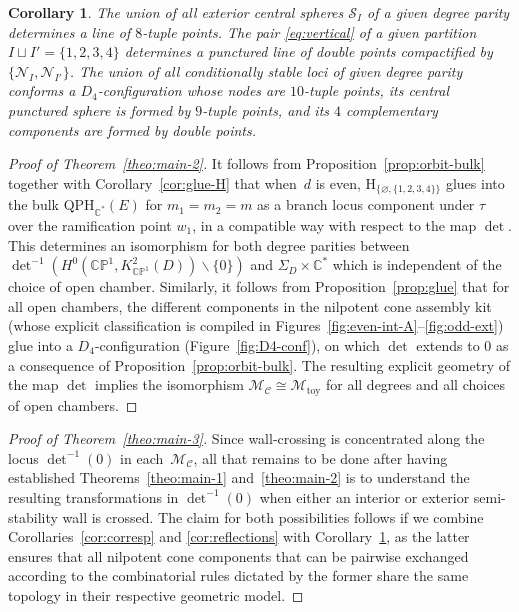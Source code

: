 \documentclass[10pt,a4paper]{amsart}
\newcommand{\field}[1]{\ensuremath{\mathbb{#1}}}
\newcommand{\CC}{\field{C}}
\newcommand{\PP}{\field{P}}
\newcommand{\curly}[1]{\mathscr{#1}}
\newcommand{\cM}{\curly{M}}
\newcommand{\cN}{\curly{N}}
\newcommand{\cS}{\curly{S}}
\newcommand{\qC}{\mathcal{C}}
\numberwithin{equation}{section}
\newtheorem{Corollary}[Theorem]{Corollary}
\begin{document}
\begin{Corollary}\label{cor:n-H-blocks}
The union of all exterior central spheres $\cS_{I}$ of a given degree parity
determines a line of $8$-tuple points. The pair \eqref{eq:vertical} of a given partition $I\sqcup I' =\{1,2,3,4\}$ determines a punctured line of double points compactified by $\{\cN_{I},\cN_{I'}\}$. The union of all conditionally stable loci of given degree parity conforms a $D_{4}$-configuration whose nodes are $10$-tuple points, its central punctured sphere is formed by $9$-tuple points, and its $4$ complementary components are formed by double points.
\end{Corollary}


{\sloppy\begin{proof}[Proof of Theorem~\ref{theo:main-2}]
It follows from Proposition~\ref{prop:orbit-bulk} together with Corollary~\ref{cor:glue-H} that when~$d$ is even, $\mathrm{H}_{\{\varnothing ,\{1,2,3,4\}\}}$ glues into the bulk $\mathrm{QPH}_{\CC^{*}}(E)$ for $m_{1}=m_{2}=m$ as a branch locus component under $\tau$ over the ramification point $w_{1}$, in a compatible way with respect to the map $\det$. This determines an isomorphism for both degree parities between $\det^{-1}(H^{0}(\CC\PP^{1},K^{2}_{\CC\PP^{1}}(D))\allowbreak\backslash\{0\})$ and $\Sigma_{D}\times\CC^{*}$ which is independent of the choice of open chamber. Similarly, it follows from Proposition~\ref{prop:glue} that for all open chambers, the different components in the nilpotent cone assembly kit (whose explicit classification is compiled in Figures~\ref{fig:even-int-A}--\ref{fig:odd-ext}) glue into a $D_{4}$-configuration (Figure~\ref{fig:D4-conf}), on which $\det$ extends to 0 as a consequence of Proposition~\ref{prop:orbit-bulk}. The resulting explicit geometry of the map $\det$ implies the isomorphism $\cM_{\qC}\cong \cM_{\mathrm{toy}}$ for all degrees and all choices of open chambers.
\end{proof}}


{\sloppy\begin{proof}[Proof of Theorem~\ref{theo:main-3}]
Since wall-crossing is concentrated along the locus $\det^{-1}(0)$ in each~$\cM_{\qC}$, all that remains to be done after having established Theorems~\ref{theo:main-1} and~\ref{theo:main-2} is to understand the resulting transformations in $\det^{-1}(0)$ when either an interior or exterior semi-stability wall is crossed. The claim for both possibilities follows if we combine Corollaries~\ref{cor:corresp} and \ref{cor:reflections} with Corollary~\ref{cor:n-H-blocks}, as the latter ensures that all nilpotent cone components that can be pairwise exchanged according to the combinatorial rules dictated by the former share the same topology in their respective geometric model. %
\end{proof}}
\end{document}
